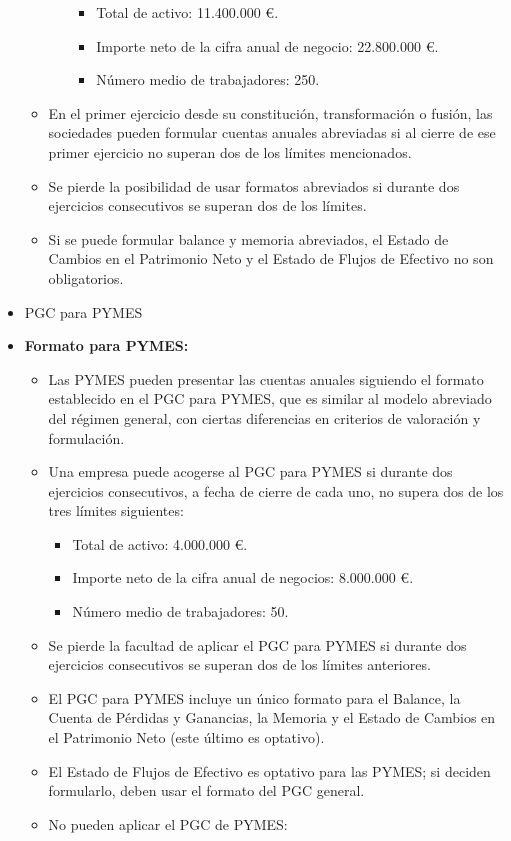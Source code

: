 \documentclass[
  paper=a4,
  ,captions=tableheading
]{scrbook}
\providecommand{\tightlist}{%
  \setlength{\itemsep}{0pt}\setlength{\parskip}{0pt}}
\begin{document}
\begin{itemize}
\begin{itemize}
\begin{itemize}
      \begin{itemize}
      \tightlist
      \item
        Total de activo: 11.400.000 €.
      \item
        Importe neto de la cifra anual de negocio: 22.800.000 €.
      \item
        Número medio de trabajadores: 250.
      \end{itemize}
    \end{itemize}
  \item
    En el primer ejercicio desde su constitución, transformación o
    fusión, las sociedades pueden formular cuentas anuales abreviadas si
    al cierre de ese primer ejercicio no superan dos de los límites
    mencionados.
  \item
    Se pierde la posibilidad de usar formatos abreviados si durante dos
    ejercicios consecutivos se superan dos de los límites.
  \item
    Si se puede formular balance y memoria abreviados, el Estado de
    Cambios en el Patrimonio Neto y el Estado de Flujos de Efectivo no
    son obligatorios.
  \end{itemize}
\item
  PGC para PYMES
\item
  \textbf{Formato para PYMES:}

  \begin{itemize}
  \tightlist
  \item
    Las PYMES pueden presentar las cuentas anuales siguiendo el formato
    establecido en el PGC para PYMES, que es similar al modelo abreviado
    del régimen general, con ciertas diferencias en criterios de
    valoración y formulación.
  \item
    Una empresa puede acogerse al PGC para PYMES si durante dos
    ejercicios consecutivos, a fecha de cierre de cada uno, no supera
    dos de los tres límites siguientes:

    \begin{itemize}
    \tightlist
    \item
      Total de activo: 4.000.000 €.
    \item
      Importe neto de la cifra anual de negocios: 8.000.000 €.
    \item
      Número medio de trabajadores: 50.
    \end{itemize}
  \item
    Se pierde la facultad de aplicar el PGC para PYMES si durante dos
    ejercicios consecutivos se superan dos de los límites anteriores.
  \item
    El PGC para PYMES incluye un único formato para el Balance, la
    Cuenta de Pérdidas y Ganancias, la Memoria y el Estado de Cambios en
    el Patrimonio Neto (este último es optativo).
  \item
    El Estado de Flujos de Efectivo es optativo para las PYMES; si
    deciden formularlo, deben usar el formato del PGC general.
  \item
    No pueden aplicar el PGC de PYMES:


\end{itemize}
\end{itemize}
\end{document}

